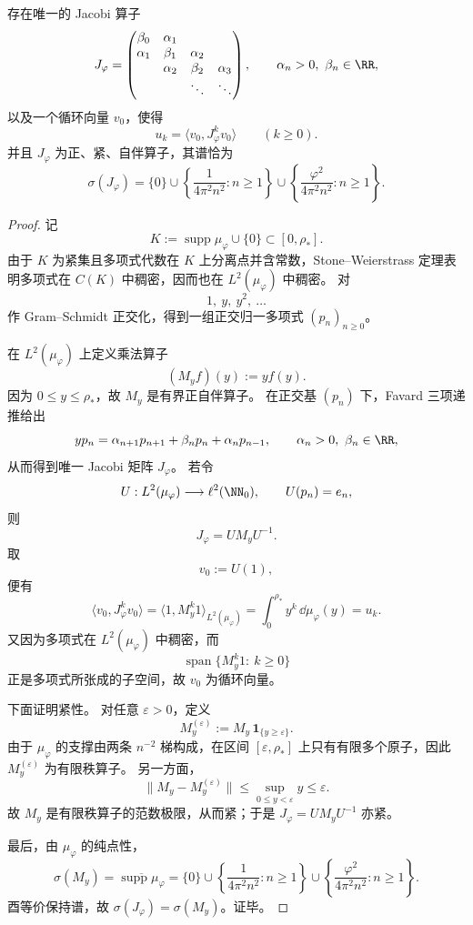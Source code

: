 \begin{theorem}\label{thm:xi-time-part9zbe-foldpi-canonical-compact-jacobi}
存在唯一的 Jacobi 算子
\[
J_\varphi=
\begin{pmatrix}
\beta_0 & \alpha_1 \\
\alpha_1 & \beta_1 & \alpha_2 \\
& \alpha_2 & \beta_2 & \alpha_3 \\
&& \ddots & \ddots
\end{pmatrix},
\qquad
\alpha_n>0,\ \beta_n\in\RR,
\]
以及一个循环向量 \(v_0\)，使得
\[
u_k=\langle v_0,J_\varphi^k v_0\rangle
\qquad (k\ge 0).
\]
并且 \(J_\varphi\) 为正、紧、自伴算子，其谱恰为
\[
\sigma(J_\varphi)
=
\{0\}
\cup
\left\{\frac{1}{4\pi^2n^2}:n\ge 1\right\}
\cup
\left\{\frac{\varphi^2}{4\pi^2n^2}:n\ge 1\right\}.
\]
\end{theorem}
\begin{proof}
记
\[
K:=\operatorname{supp}\mu_\varphi\cup\{0\}\subset [0,\rho_\ast].
\]
由于 \(K\) 为紧集且多项式代数在 \(K\) 上分离点并含常数，Stone--Weierstrass 定理表明多项式在 \(C(K)\) 中稠密，因而也在 \(L^2(\mu_\varphi)\) 中稠密。
对
\[
1,\ y,\ y^2,\ \dots
\]
作 Gram--Schmidt 正交化，得到一组正交归一多项式 \((p_n)_{n\ge 0}\)。

在 \(L^2(\mu_\varphi)\) 上定义乘法算子
\[
(M_yf)(y):=yf(y).
\]
因为 \(0\le y\le \rho_\ast\)，故 \(M_y\) 是有界正自伴算子。
在正交基 \((p_n)\) 下，Favard 三项递推给出
\[
yp_n=\alpha_{n+1}p_{n+1}+\beta_n p_n+\alpha_n p_{n-1},
\qquad
\alpha_n>0,\ \beta_n\in\RR,
\]
从而得到唯一 Jacobi 矩阵 \(J_\varphi\)。
若令
\[
U:L^2(\mu_\varphi)\longrightarrow \ell^2(\NN_0),
\qquad
U(p_n)=e_n,
\]
则
\[
J_\varphi=UM_yU^{-1}.
\]
取
\[
v_0:=U(1),
\]
便有
\[
\langle v_0,J_\varphi^k v_0\rangle
=
\langle 1,M_y^k1\rangle_{L^2(\mu_\varphi)}
=
\int_0^{\rho_\ast}y^k\,\dd\mu_\varphi(y)
=
u_k.
\]
又因为多项式在 \(L^2(\mu_\varphi)\) 中稠密，而
\[
\operatorname{span}\{M_y^k1:\ k\ge 0\}
\]
正是多项式所张成的子空间，故 \(v_0\) 为循环向量。

下面证明紧性。
对任意 \(\varepsilon>0\)，定义
\[
M_y^{(\varepsilon)}:=M_y\,\mathbf 1_{\{y\ge \varepsilon\}}.
\]
由于 \(\mu_\varphi\) 的支撑由两条 \(n^{-2}\) 梯构成，在区间 \([\varepsilon,\rho_\ast]\) 上只有有限多个原子，因此 \(M_y^{(\varepsilon)}\) 为有限秩算子。
另一方面，
\[
\|M_y-M_y^{(\varepsilon)}\|
\le
\sup_{0\le y<\varepsilon}y
\le
\varepsilon.
\]
故 \(M_y\) 是有限秩算子的范数极限，从而紧；于是 \(J_\varphi=UM_yU^{-1}\) 亦紧。

最后，由 \(\mu_\varphi\) 的纯点性，
\[
\sigma(M_y)=\overline{\operatorname{supp}\mu_\varphi}
=
\{0\}
\cup
\left\{\frac{1}{4\pi^2n^2}:n\ge 1\right\}
\cup
\left\{\frac{\varphi^2}{4\pi^2n^2}:n\ge 1\right\}.
\]
酉等价保持谱，故 \(\sigma(J_\varphi)=\sigma(M_y)\)。证毕。
\end{proof}

